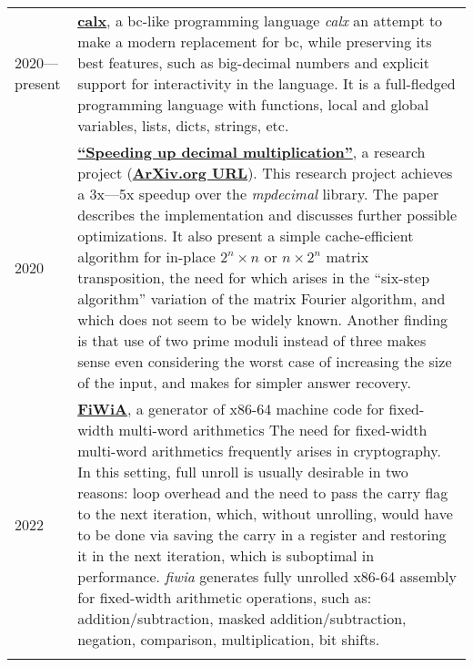 \documentclass[10pt]{article}
\begin{document}
\begin{tabularx}{\textwidth}{ l X }
    2020---present & \href{https://github.com/shdown/calx}{\textbf{calx}}, a bc-like programming language
    \newline
    \textit{calx} an attempt to make a modern replacement for bc, while preserving its best features, such as big-decimal numbers and explicit support for interactivity in the language.
    It is a full-fledged programming language with functions, local and global variables, lists, dicts, strings, etc.
    \\
    \medskip

    2020 & \href{https://github.com/shdown/decimal-multiplication-paper}{\textbf{``Speeding up decimal multiplication''}}, a research project (\href{https://arxiv.org/abs/2011.11524}{\textbf{ArXiv.org URL}}).
    \newline
    This research project achieves a 3x---5x speedup over the \textit{mpdecimal} library.
    The paper describes the implementation and discusses further possible optimizations. It also present a simple cache-efficient algorithm for in-place
    $2^n \times n$ or $n \times 2^n$ matrix transposition, the need for which arises in the
    ``six-step algorithm'' variation of the matrix Fourier algorithm, and
    which does not seem to be widely known. Another finding is that use
    of two prime moduli instead of three makes sense even considering the
    worst case of increasing the size of the input, and makes for simpler
    answer recovery.
    \\
    \medskip

    2022 & \href{https://github.com/shdown/fiwia}{\textbf{FiWiA}}, a generator of x86-64 machine code for fixed-width multi-word arithmetics
    \newline
    The need for fixed-width multi-word arithmetics frequently arises in cryptography.
    In this setting, full unroll is usually desirable in two reasons: loop overhead and the need to pass the carry flag to the next iteration,
    which, without unrolling, would have to be done via saving the carry in a register and restoring it in the next iteration,
    which is suboptimal in performance.
    \textit{fiwia} generates fully unrolled x86-64 assembly for fixed-width arithmetic operations, such as:
    addition/subtraction,
    masked addition/subtraction,
    negation,
    comparison,
    multiplication,
    bit shifts.
    \\
    \medskip


\end{tabularx}
\end{document}
